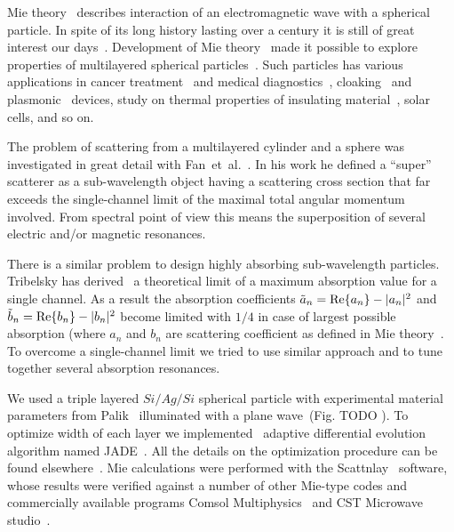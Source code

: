 \documentclass[aps,prl,twocolumn,showpacs,superscriptaddress,groupedaddress]{revtex4-1}
\begin{document}
\maketitle %

Mie theory~\cite{Mie-1908} describes interaction of an electromagnetic
wave with a spherical particle.  In spite of its long history lasting
over a century it is still of great interest our
days~\cite{Suzuki-2008,MacKowski-2012,Lerme-2000,Xu-2005,Li-2006,Gogoi-2010,Santiago-2011}.
Development of Mie theory~\cite{Yang-2003, Pena-scattnlay-2009} made
it possible to explore properties of multilayered spherical
particles~\cite{Sheehan-2013,Selmke-2012}. Such particles has various
applications in cancer treatment~\cite{Zhang-2010, Hirsch-2003} and
medical diagnostics~\cite{Allain-2002},
cloaking~\cite{Qui-2009,Semouchkina-2013, Ladutenko-2014} and
plasmonic~\cite{Martin-2013, Alu-2005} devices, study on thermal
properties of insulating material~\cite{Xie-2013}, solar cells\cite{Kameya-2011,Mann-2011},
and so on.

The problem of scattering from a multilayered cylinder and a sphere
was investigated in great detail with Fan~et~al.~\cite{Fan-2010,Fan-2011}.
In his work he defined a ``super'' scatterer as a sub-wavelength object
having a scattering cross section that far exceeds the single-channel
limit of the maximal total angular momentum involved.  From spectral
point of view this means the superposition of several electric and/or
magnetic resonances.

There is a similar problem to design highly absorbing sub-wavelength
particles.  Tribelsky has derived~\cite{Tribelsky-2011} a theoretical
limit of a maximum absorption value for a single channel.  As a result
the absorption coefficients $\tilde{a}_n= {\rm Re}\{a_n\} - |a_n|^2 $
and $\tilde{b}_n= {\rm Re}\{b_n\} - |b_n|^2 $ become limited with
$1/4$ in case of largest possible absorption (where $a_n$ and $b_n$
are scattering coefficient as defined in Mie
theory~\cite{Bohren-1983}.  To overcome a single-channel limit we
tried to use similar approach and to tune together several absorption
resonances.

We used a triple layered $Si/Ag/Si$ spherical particle with
experimental material parameters from Palik~\cite{palik-1997}
illuminated with a plane wave~(Fig. TODO ).  To optimize width of each
layer we implemented~\cite{JADE-web} adaptive differential
evolution~\cite{Storn-DE-first-1997} algorithm named
JADE~\cite{Jingqiao-JADE-2009}.  All the details on the optimization
procedure can be found elsewhere~\cite{Ladutenko-2014}.  Mie
calculations were performed with the
Scattnlay~\cite{Pena-scattnlay-2009,Scattnlay-web} software, whose results were
verified against a number of other Mie-type codes and commercially
available programs Comsol Multiphysics~\cite{CST-web} and CST Microwave
studio~\cite{CST-web}.
\end{document}
